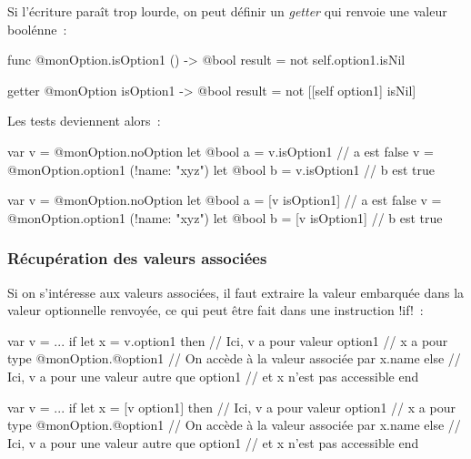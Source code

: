 Si l'écriture paraît trop lourde, on peut définir un \emph{getter} qui renvoie une valeur boolénne~:
\begin{galgas4}
func @monOption.isOption1 () -> @bool {
  result = not self.option1.isNil
}
\end{galgas4}
\begin{galgas3}
getter @monOption isOption1 -> @bool {
  result = not [[self option1] isNil]
}
\end{galgas3}

Les tests deviennent alors~:
\begin{galgas4}
var v = @monOption.noOption
let @bool a = v.isOption1 // a est false
v = @monOption.option1 (!name: "xyz")
let @bool b = v.isOption1 // b est true
\end{galgas4}
\begin{galgas3}
var v = @monOption.noOption
let @bool a = [v isOption1] // a est false
v = @monOption.option1 (!name: "xyz")
let @bool b = [v isOption1] // b est true
\end{galgas3}




\subsubsection{Récupération des valeurs associées}

Si on s'intéresse aux valeurs associées, il faut extraire la valeur embarquée dans la valeur optionnelle renvoyée, ce qui peut être fait dans une instruction \ggsq!if!~:

\begin{galgas4}
var v = ...
if let x = v.option1 then
  // Ici, v a pour valeur option1
  // x a pour type @monOption.@option1
  // On accède à la valeur associée par x.name
else
  // Ici, v a pour une valeur autre que option1
  // et x n'est pas accessible
end
\end{galgas4}

\begin{galgas3}
var v = ...
if let x = [v option1] then
  // Ici, v a pour valeur option1
  // x a pour type @monOption.@option1
  // On accède à la valeur associée par x.name
else
  // Ici, v a pour une valeur autre que option1
  // et x n'est pas accessible
end
\end{galgas3}



















